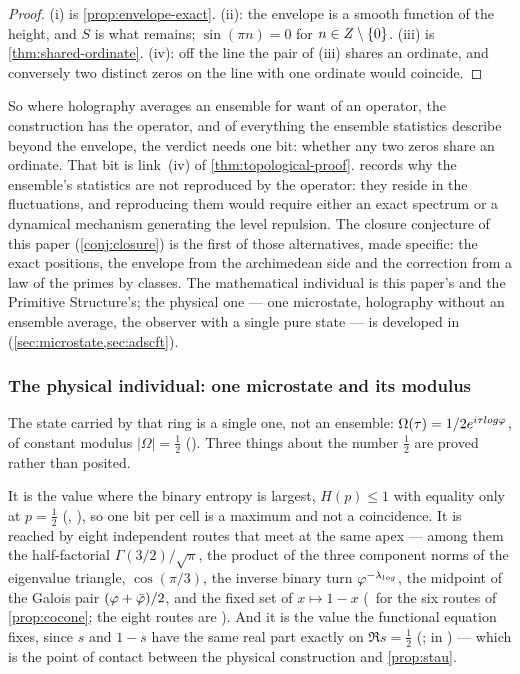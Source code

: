 \begin{proof}
(i) is \cref{prop:envelope-exact}.  (ii): the envelope is a smooth function of the height,
and $S$ is what remains; $\sin(\pi n)=0$ for $n\in Z\setminus\{0\}$.  (iii) is
\cref{thm:shared-ordinate}.  (iv): off the line the pair of (iii) shares an ordinate, and
conversely two distinct zeros on the line with one ordinate would coincide.
\end{proof}

So where holography averages an ensemble for want of an operator, the construction
has the operator, and of everything the ensemble statistics describe beyond the
envelope, the verdict needs one bit: whether any two zeros share an ordinate.  That bit is link~(iv) of \cref{thm:topological-proof}.  \cite[Remark~2.88]{gonzalez26cw} records why the ensemble's
statistics are not reproduced by the operator: they reside in the fluctuations, and reproducing
them would require either an exact spectrum or a dynamical mechanism generating the level
repulsion.  The closure conjecture of this paper (\cref{conj:closure}) is the first of those
alternatives, made specific: the exact positions, the envelope from the archimedean side and the
correction from a law of the primes by classes.  The mathematical individual is this paper's and the
Primitive Structure's; the physical one --- one microstate, holography without an
ensemble average, the observer with a single pure state --- is developed in
\cite{gonzalez26cw} (\cref{sec:microstate,sec:adscft}).

\subsubsection{The physical individual: one microstate and its modulus}\label{sec:microstate}

The state carried by that ring is a single one, not an ensemble:
$\Omega(\tau)=1/2e^{i\tau log\varphi}$, of constant modulus
$|\Omega|=\tfrac12$  ().  Three things about the number
$\tfrac12$ are proved rather than posited.

It is the value where the binary entropy is largest, $H(p)\le1$ with equality
only at $p=\tfrac12$  (,
), so one bit per cell is a maximum and
not a coincidence.  It is reached by eight independent routes that meet at the
same apex --- among them the half-factorial $\Gamma(3/2)/\sqrt\pi$, the product of
the three component norms of the eigenvalue triangle, $\cos(\pi/3)$, the inverse
binary turn $\varphi^{-\lambda_{log}}$, the midpoint of the Galois pair
$(\varphi+\bar{\varphi})/2$, and the fixed set of $x\mapsto1-x$
(\ for the six routes of \cref{prop:cocone}; the eight routes are ).  And it is the value the
functional equation fixes, since $s$ and $1-s$ have the same real part exactly on
$\Re s=\tfrac12$ (; in \cite{gonzalez26cw} ) --- which is the point of contact
between the physical construction and \cref{prop:stau}.

